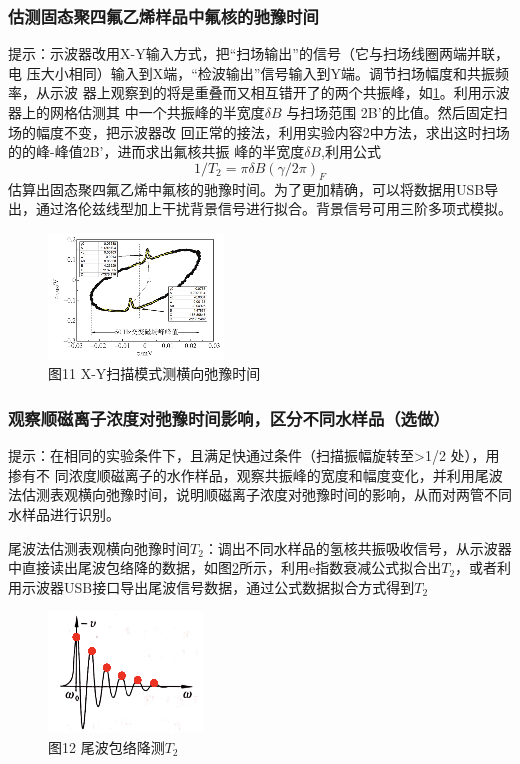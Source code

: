 \documentclass{ctexart}
\begin{document}
	
	\subsubsection{估测固态聚四氟乙烯样品中氟核的驰豫时间}
	提示：示波器改用X-Y输入方式，把“扫场输出”的信号（它与扫场线圈两端并联，电
	压大小相同）输入到X端，“检波输出”信号输入到Y端。调节扫场幅度和共振频率，从示波
	器上观察到的将是重叠而又相互错开了的两个共振峰，如\ref{图11}。利用示波器上的网格估测其
	中一个共振峰的半宽度$\delta B$ 与扫场范围 2B'的比值。然后固定扫场的幅度不变，把示波器改
	回正常的接法，利用实验内容2中方法，求出这时扫场的的峰-峰值2B'，进而求出氟核共振
	峰的半宽度$\delta B$,利用公式$$1/T_2=\pi\delta B(\gamma/2\pi)_F$$估算出固态聚四氟乙烯中氟核的驰豫时间。为了更加精确，可以将数据用USB导出，通过洛伦兹线型加上干扰背景信号进行拟合。背景信号可用三阶多项式模拟。
	\begin{figure}[H]
		\centering
		\includegraphics[scale=2]{11}
		\caption{图11 X-Y扫描模式测横向弛豫时间}\label{图11}
	\end{figure}
	
	
	\subsubsection{观察顺磁离子浓度对弛豫时间影响，区分不同水样品（选做）}
	提示：在相同的实验条件下，且满足快通过条件（扫描振幅旋转至>1/2 处），用掺有不
	同浓度顺磁离子的水作样品，观察共振峰的宽度和幅度变化，并利用尾波法估测表观横向弛豫时间，说明顺磁离子浓度对弛豫时间的影响，从而对两管不同水样品进行识别。
	
	尾波法估测表观横向弛豫时间$T_2$：调出不同水样品的氢核共振吸收信号，从示波器中直接读出尾波包络降的数据，如图\ref{图12}所示，利用e指数衰减公式拟合出$T_2$，或者利用示波器USB接口导出尾波信号数据，通过公式数据拟合方式得到$T_2$
	\begin{figure}[H]
		\centering
		\includegraphics[scale=2]{12}
		\caption{图12 尾波包络降测$T_2$}\label{图12}
	\end{figure}
	
\end{document}
